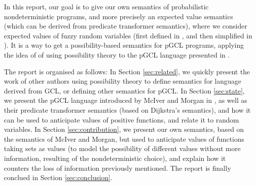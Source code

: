 \documentclass[a4paper,10pt]{llncs}
\begin{document}
In this report, our goal is to give our own semantics of probabilistic nondeterministic programs, and more precisely an expected value semantics (which can be derived from predicate transformer semantics), where we consider expected values of fuzzy random variables (first defined in \cite{PuriRal86}, and then simplified in \cite{Shapiro09}). It is a way to get a possibility-based semantics for pGCL programs, applying the idea of \cite{WuChen08,WuChen11,WuChen12} of using possibility theory to the pGCL language presented in \cite{McIver05}.\bigskip

The report is organised as follows: In Section \ref{sec:related}, we quickly present the work of other authors using possibility theory to define semantics for language derived from GCL, or defining other semantics for pGCL. In Section \ref{sec:state}, we present the pGCL language introduced by McIver and Morgan in \cite{McIver05}, as well as their predicate transformer semantics (based on Dijkstra's semantics), and how it can be used to anticipate values of positive functions, and relate it to random variables. In Section \ref{sec:contribution}, we present our own semantics, based on the semantics of McIver and Morgan, but used to anticipate values of functions taking sets as values (to model the possibility of different values without more information, resulting of the nondeterministic choice), and explain how it counters the loss of information previously mentioned. The report is finally conclued in Section \ref{sec:conclusion}.
\end{document}
